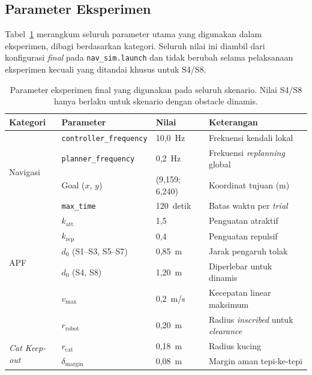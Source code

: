 \subsection{Parameter Eksperimen}
\label{sec:param_eksperimen}

Tabel~\ref{tab:param_eksperimen} merangkum seluruh parameter utama yang digunakan dalam eksperimen, dibagi berdasarkan kategori. Seluruh nilai ini diambil dari konfigurasi \textit{final} pada \texttt{nav\_sim.launch} dan tidak berubah selama pelaksanaan eksperimen kecuali yang ditandai khusus untuk S4/S8.

\begin{table}[H]
\centering
\caption{Parameter eksperimen final yang digunakan pada seluruh skenario. Nilai S4/S8 hanya berlaku untuk skenario dengan obstacle dinamis.}
\label{tab:param_eksperimen}
\begin{tabular}{llll}
\toprule
\textbf{Kategori} & \textbf{Parameter} & \textbf{Nilai} & \textbf{Keterangan} \\
\midrule
\multirow{4}{*}{Navigasi}
  & \texttt{controller\_frequency} & 10{,}0~Hz & Frekuensi kendali lokal \\
  & \texttt{planner\_frequency}    & 0{,}2~Hz  & Frekuensi \textit{replanning} global \\
  & Goal ($x$, $y$)                & (9{,}159; 6{,}240) & Koordinat tujuan (m) \\
  & \texttt{max\_time}             & 120~detik & Batas waktu per \textit{trial} \\
\midrule
\multirow{5}{*}{APF}
  & $k_\text{att}$     & 1,5     & Penguatan atraktif \\
  & $k_\text{rep}$     & 0,4     & Penguatan repulsif \\
  & $d_0$ (S1--S3, S5--S7)         & 0,85~m  & Jarak pengaruh tolak \\
  & $d_0$ (S4, S8)                  & 1,20~m  & Diperlebar untuk dinamis \\
  & $v_\text{max}$     & 0,2~m/s & Kecepatan linear maksimum \\
  & $r_\text{robot}$   & 0,20~m  & Radius \textit{inscribed} untuk \textit{clearance} \\
\midrule
\multirow{5}{*}{\textit{Cat Keep-out}}
  & $r_\text{cat}$               & 0,18~m & Radius kucing \\
  & $\delta_\text{margin}$       & 0,08~m & Margin aman tepi-ke-tepi \\

\end{tabular}
\end{table}
